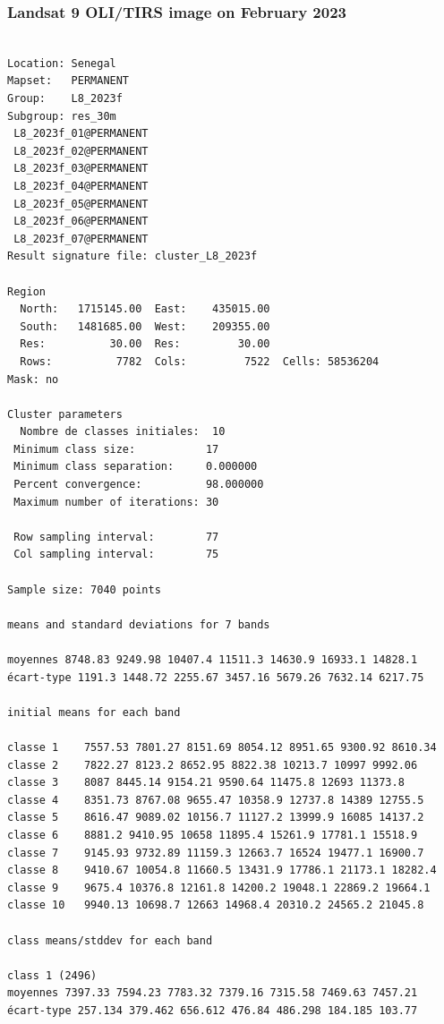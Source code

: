 \documentclass[earth,article,submit,pdftex,moreauthors]{Definitions/mdpi}
\begin{document}
\subsubsection[\appendixname~\thesubsubsection]{Landsat 9 OLI/TIRS image on February 2023}
\begin{scriptsize}
\begin{verbatim}

Location: Senegal
Mapset:   PERMANENT
Group:    L8_2023f
Subgroup: res_30m
 L8_2023f_01@PERMANENT
 L8_2023f_02@PERMANENT
 L8_2023f_03@PERMANENT
 L8_2023f_04@PERMANENT
 L8_2023f_05@PERMANENT
 L8_2023f_06@PERMANENT
 L8_2023f_07@PERMANENT
Result signature file: cluster_L8_2023f

Region
  North:   1715145.00  East:    435015.00
  South:   1481685.00  West:    209355.00
  Res:          30.00  Res:         30.00
  Rows:          7782  Cols:         7522  Cells: 58536204
Mask: no

Cluster parameters
  Nombre de classes initiales: 	10
 Minimum class size:           17
 Minimum class separation:     0.000000
 Percent convergence:          98.000000
 Maximum number of iterations: 30

 Row sampling interval:        77
 Col sampling interval:        75

Sample size: 7040 points

means and standard deviations for 7 bands

moyennes 8748.83 9249.98 10407.4 11511.3 14630.9 16933.1 14828.1
écart-type 1191.3 1448.72 2255.67 3457.16 5679.26 7632.14 6217.75

initial means for each band

classe 1    7557.53 7801.27 8151.69 8054.12 8951.65 9300.92 8610.34
classe 2    7822.27 8123.2 8652.95 8822.38 10213.7 10997 9992.06
classe 3    8087 8445.14 9154.21 9590.64 11475.8 12693 11373.8
classe 4    8351.73 8767.08 9655.47 10358.9 12737.8 14389 12755.5
classe 5    8616.47 9089.02 10156.7 11127.2 13999.9 16085 14137.2
classe 6    8881.2 9410.95 10658 11895.4 15261.9 17781.1 15518.9
classe 7    9145.93 9732.89 11159.3 12663.7 16524 19477.1 16900.7
classe 8    9410.67 10054.8 11660.5 13431.9 17786.1 21173.1 18282.4
classe 9    9675.4 10376.8 12161.8 14200.2 19048.1 22869.2 19664.1
classe 10   9940.13 10698.7 12663 14968.4 20310.2 24565.2 21045.8

class means/stddev for each band

class 1 (2496)
moyennes 7397.33 7594.23 7783.32 7379.16 7315.58 7469.63 7457.21
écart-type 257.134 379.462 656.612 476.84 486.298 184.185 103.77


\end{verbatim}
\end{scriptsize}
\end{document}
